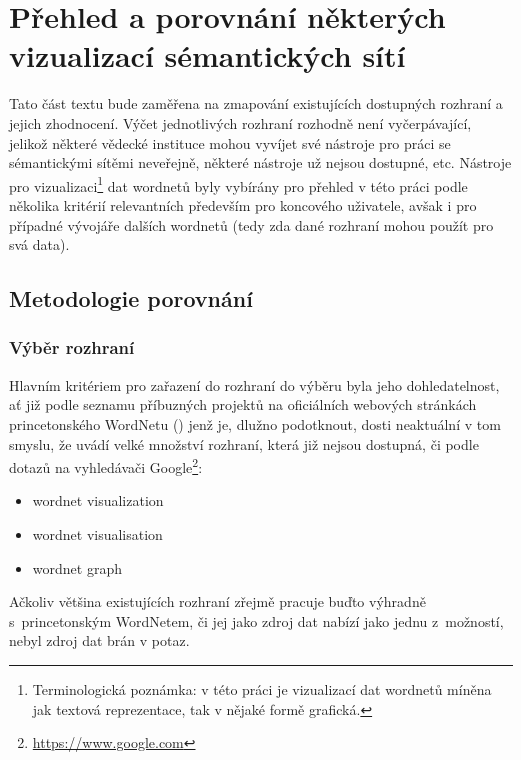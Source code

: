 \documentclass[a4paper, 11pt, oneside, showtrims]{book}
\begin{document}
				

	\part{Přehled a porovnání některých vizualizací sémantických sítí}
	\label{part:zwei}

		Tato část textu bude zaměřena na zmapování existujících dostupných rozhraní a jejich zhodnocení. Výčet jednotlivých rozhraní rozhodně není vyčerpávající, jelikož některé vědecké instituce mohou vyvíjet své nástroje pro práci se sémantickými sítěmi neveřejně, některé nástroje už nejsou dostupné, etc. Nástroje pro vizualizaci\footnote{Terminologická poznámka: v této práci je vizualizací dat wordnetů míněna jak textová reprezentace, tak v nějaké formě grafická.} dat wordnetů byly vybírány pro přehled v této práci podle několika kritérií relevantních především pro koncového uživatele, avšak i pro případné vývojáře dalších wordnetů (tedy zda dané rozhraní mohou použít pro svá data).

		\chapter{Metodologie porovnání}

			\section{Výběr rozhraní}

				Hlavním kritériem pro zařazení do rozhraní do výběru byla jeho dohledatelnost, ať již podle seznamu příbuzných projektů na oficiálních webových stránkách princetonského WordNetu (\textcite{princetonWN}) jenž je, dlužno podotknout, dosti neaktuální v tom smyslu, že uvádí velké množství rozhraní, která již nejsou dostupná, či podle dotazů na vyhledávači Google\footnote{\url{https://www.google.com}}:

					\begin{itemize}
						\item wordnet visualization
						\item wordnet visualisation
						\item wordnet graph
					\end{itemize}

					 Ačkoliv většina existujících rozhraní zřejmě pracuje buďto výhradně s~princetonským WordNetem, či jej jako zdroj dat nabízí jako jednu z~možností, nebyl zdroj dat brán v potaz.
\end{document}
